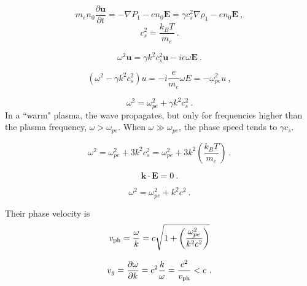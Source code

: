 \documentclass[12pt,a4paper]{article}
\renewcommand{\vec}[1]{\boldsymbol{#1}}
\begin{document}
\begin{equation*}
m_e n_0 \frac{\partial \vec{u} }{\partial t} = -\nabla P_1 - e n_0 \vec{E} = \gamma c_s^2 \nabla \rho_1 -e n_0 \vec{E} ~,
\end{equation*}
\begin{equation*}
c_s^2 = \frac{k_B T}{m_e} ~.
\end{equation*}

\begin{equation*}
\omega^2 \vec{u} =  \gamma k^2 c_s^2 \vec{u} -ie \omega \vec{E} ~.
\end{equation*}

\begin{equation*}
(\omega^2 -  \gamma k^2 c_s^2) u = -i \frac{e}{m_e} \omega E = -\omega_{pe}^2 u ~,
\end{equation*}

\begin{equation*}
\omega^2 = \omega^2_{pe} + \gamma k^2 c_s^2 ~.
\end{equation*}
In a ``warm" plasma, the wave propagates, but only for frequencies higher than the plasma frequency, $\omega > \omega_{pe}$. When $\omega \gg \omega_{pe}$, the phase speed tends to $\gamma c_s$.

\begin{equation}
\omega^2 = \omega^2_{pe} + 3k^2 c_s^2 = \omega^2_{pe} + 3 k^2 \left( \frac{k_B T}{m_e} \right) ~.
\end{equation}

\begin{equation*}
\vec{k} \cdot \vec{E} = 0 ~.
\end{equation*}

\begin{equation}
\omega^2 = \omega^2_{pe} + k^2 c^2 ~.
\end{equation}

Their phase velocity is
\begin{equation*}
v_{\rm ph} =  \frac{\omega}{k} = c \sqrt{1+\left( \frac{\omega^2_{pe}}{k^2 c^2} \right)}
\end{equation*}

\begin{equation*}
v_g = \frac{\partial \omega}{\partial k} = c^2 \frac{k}{\omega} = \frac{c^2}{v_{\rm ph} } < c ~.
\end{equation*}
\end{document}
